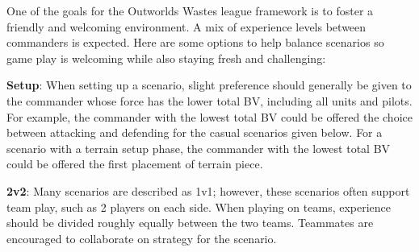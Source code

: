 One of the goals for the Outworlds Wastes league framework is to foster a friendly and welcoming environment.
A mix of experience levels between commanders is expected.
Here are some options to help balance scenarios so game play is welcoming while also staying fresh and challenging:

\begin{description}

\item {\bfseries Setup}: When setting up a scenario, slight preference should generally be given to the commander whose force has the lower total BV, including all units and pilots.
For example, the commander with the lowest total BV could be offered the choice between attacking and defending for the casual scenarios given below.
For a scenario with a terrain setup phase, the commander with the lowest total BV could be offered the first placement of terrain piece.

\item {\bfseries 2v2}: Many scenarios are described as 1v1; however, these scenarios often support team play, such as 2 players on each side.
When playing on teams, experience should be divided roughly equally between the two teams.
Teammates are encouraged to collaborate on strategy for the scenario.

\end{description}

